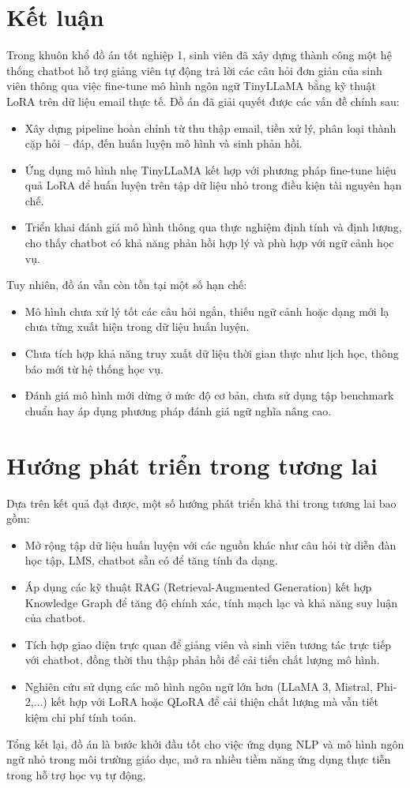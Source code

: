 \documentclass[../DoAn.tex]{subfiles}
\begin{document}
\section{Kết luận}

Trong khuôn khổ đồ án tốt nghiệp 1, sinh viên đã xây dựng thành công một hệ thống chatbot hỗ trợ giảng viên tự động trả lời các câu hỏi đơn giản của sinh viên thông qua việc fine-tune mô hình ngôn ngữ TinyLLaMA bằng kỹ thuật LoRA trên dữ liệu email thực tế. Đồ án đã giải quyết được các vấn đề chính sau:

\begin{itemize}
    \item Xây dựng pipeline hoàn chỉnh từ thu thập email, tiền xử lý, phân loại thành cặp hỏi – đáp, đến huấn luyện mô hình và sinh phản hồi.
    \item Ứng dụng mô hình nhẹ TinyLLaMA kết hợp với phương pháp fine-tune hiệu quả LoRA để huấn luyện trên tập dữ liệu nhỏ trong điều kiện tài nguyên hạn chế.
    \item Triển khai đánh giá mô hình thông qua thực nghiệm định tính và định lượng, cho thấy chatbot có khả năng phản hồi hợp lý và phù hợp với ngữ cảnh học vụ.
\end{itemize}

Tuy nhiên, đồ án vẫn còn tồn tại một số hạn chế:

\begin{itemize}
    \item Mô hình chưa xử lý tốt các câu hỏi ngắn, thiếu ngữ cảnh hoặc dạng mới lạ chưa từng xuất hiện trong dữ liệu huấn luyện.
    \item Chưa tích hợp khả năng truy xuất dữ liệu thời gian thực như lịch học, thông báo mới từ hệ thống học vụ.
    \item Đánh giá mô hình mới dừng ở mức độ cơ bản, chưa sử dụng tập benchmark chuẩn hay áp dụng phương pháp đánh giá ngữ nghĩa nâng cao.
\end{itemize}

\section{Hướng phát triển trong tương lai}

Dựa trên kết quả đạt được, một số hướng phát triển khả thi trong tương lai bao gồm:

\begin{itemize}
    \item Mở rộng tập dữ liệu huấn luyện với các nguồn khác như câu hỏi từ diễn đàn học tập, LMS, chatbot sẵn có để tăng tính đa dạng.
    \item Áp dụng các kỹ thuật RAG (Retrieval-Augmented Generation) kết hợp Knowledge Graph để tăng độ chính xác, tính mạch lạc và khả năng suy luận của chatbot.
    \item Tích hợp giao diện trực quan để giảng viên và sinh viên tương tác trực tiếp với chatbot, đồng thời thu thập phản hồi để cải tiến chất lượng mô hình.
    \item Nghiên cứu sử dụng các mô hình ngôn ngữ lớn hơn (LLaMA 3, Mistral, Phi-2,...) kết hợp với LoRA hoặc QLoRA để cải thiện chất lượng mà vẫn tiết kiệm chi phí tính toán.
\end{itemize}

Tổng kết lại, đồ án là bước khởi đầu tốt cho việc ứng dụng NLP và mô hình ngôn ngữ nhỏ trong môi trường giáo dục, mở ra nhiều tiềm năng ứng dụng thực tiễn trong hỗ trợ học vụ tự động.
\end{document}
